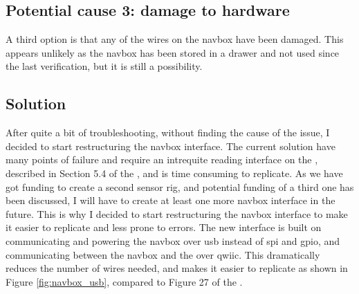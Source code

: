 \subsection{Potential cause 3: damage to hardware}
A third option is that any of the wires on the \gls{navbox} have been damaged.
This appears unlikely as the \gls{navbox} has been stored in a drawer and not used since the last verification, but it is still a possibility.

\subsection{Solution}
After quite a bit of troubleshooting, without finding the cause of the issue, I decided to start restructuring the \gls{navbox} interface.
The current solution have many points of failure and require an intrequite reading interface on the \jx, described in Section 5.4 of the \preproject, and is time consuming to replicate.
As we have got funding to create a second sensor rig, and potential funding of a third one has been discussed, I will have to create at least one more \gls{navbox} interface in the future.
This is why I decided to start restructuring the \gls{navbox} interface to make it easier to replicate and less prone to errors.
The new interface is built on communicating and powering the \gls{navbox} over \gls{usb} instead of \gls{spi} and \gls{gpio}, and communicating between the \gls{navbox} and the  over \gls{qwiic}.
This dramatically reduces the number of wires needed, and makes it easier to replicate as shown in Figure \ref{fig:navbox_usb}, compared to Figure 27 of the \preproject.

